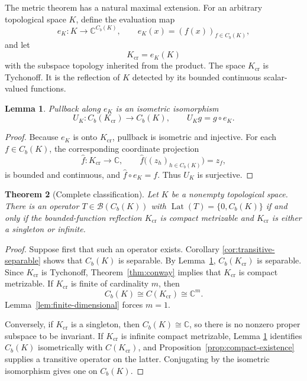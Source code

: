 \documentclass[11pt]{article}
\newtheorem{theorem}{Theorem}[section]
\newtheorem{lemma}[theorem]{Lemma}
\theoremstyle{remark}
\newcommand{\Cb}{C_b}
\newcommand{\B}{\mathcal B}
\newcommand{\Lat}{\operatorname{Lat}}
\newcommand{\C}{\mathbb C}
\begin{document}
The metric theorem has a natural maximal extension.  For an arbitrary
topological space $K$, define the evaluation map
\[
  e_K:K\longrightarrow \C^{\Cb(K)},\qquad
  e_K(x)=(f(x))_{f\in\Cb(K)},
\]
and let
\[
  K_{\mathrm{cr}}=e_K(K)
\]
with the subspace topology inherited from the product.  The space
$K_{\mathrm{cr}}$ is Tychonoff.  It is the reflection of $K$ detected by its
bounded continuous scalar-valued functions.

\begin{lemma}\label{lem:reflection}
Pullback along $e_K$ is an isometric isomorphism
\[
  U_K:\Cb(K_{\mathrm{cr}})\longrightarrow \Cb(K),
  \qquad U_Kg=g\circ e_K.
\]
\end{lemma}

\begin{proof}
Because $e_K$ is onto $K_{\mathrm{cr}}$, pullback is isometric and injective.
For each $f\in\Cb(K)$, the corresponding coordinate projection
\[
  \widehat f:K_{\mathrm{cr}}\to\C,
  \qquad \widehat f\bigl((z_h)_{h\in\Cb(K)}\bigr)=z_f,
\]
is bounded and continuous, and $\widehat f\circ e_K=f$.  Thus $U_K$ is
surjective.
\end{proof}

\begin{theorem}[Complete classification]\label{thm:main}
Let $K$ be a nonempty topological space.  There is an operator
$T\in\B(\Cb(K))$ with $\Lat(T)=\{0,\Cb(K)\}$ if and only if the
bounded-function reflection $K_{\mathrm{cr}}$ is compact metrizable and
$K_{\mathrm{cr}}$ is either a singleton or infinite.
\end{theorem}

\begin{proof}
Suppose first that such an operator exists.  Corollary
\ref{cor:transitive-separable} shows that $\Cb(K)$ is separable.  By
Lemma~\ref{lem:reflection}, $\Cb(K_{\mathrm{cr}})$ is separable.  Since
$K_{\mathrm{cr}}$ is Tychonoff, Theorem~\ref{thm:conway} implies that
$K_{\mathrm{cr}}$ is compact metrizable.  If $K_{\mathrm{cr}}$ is finite of
cardinality $m$, then
\[
  \Cb(K)\cong C(K_{\mathrm{cr}})\cong\C^m.
\]
Lemma~\ref{lem:finite-dimensional} forces $m=1$.

Conversely, if $K_{\mathrm{cr}}$ is a singleton, then
$\Cb(K)\cong\C$, so there is no nonzero proper subspace to be invariant.  If
$K_{\mathrm{cr}}$ is infinite compact metrizable, Lemma
\ref{lem:reflection} identifies $\Cb(K)$ isometrically with
$C(K_{\mathrm{cr}})$, and Proposition~\ref{prop:compact-existence} supplies
a transitive operator on the latter.  Conjugating by the isometric
isomorphism gives one on $\Cb(K)$.
\end{proof}
\end{document}
